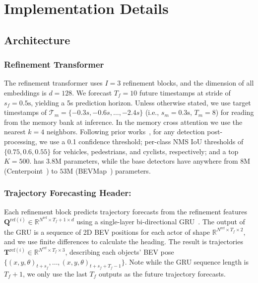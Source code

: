 \section{Implementation Details}
\label{sec:imp}

\subsection{Architecture}

\subsubsection{Refinement Transformer}

The refinement transformer uses $I = 3$ refinement blocks, and the dimension of all embeddings is $d = 128$.
We forecast $T_f = 10$ future timestamps at stride of $s_f = 0.5\text{s}$, yielding a 5s prediction horizon.
Unless otherwise stated, we use target timestamps of $\mathcal{T}_m = \{-0.3s, -0.6s, \dots, -2.4s\}$ (i.e., $s_m = 0.3\text{s}$, $T_m = 8$) for reading from the memory bank at inference.
In the memory cross attention we use the nearest $k=4$ neighbors.
Following prior works~\cite{hednet,safdnet,centerpoint}, for any detection post-processing, we use a 0.1 confidence threshold; per-class NMS IoU thresholds of $\{0.75, 0.6, 0.55\}$ for vehicles, pedestrians, and cyclists, respectively; and a top $K=500$.
\ourmodel{} has $3.8$M parameters, while the base detectors have anywhere from $8$M (Centerpoint~\cite{centerpoint}) to $53$M (BEVMap~\cite{chang2024bevmap}) parameters.


\subsubsection{Trajectory Forecasting Header:}

Each refinement block predicts trajectory forecasts from the refinement features $\mathbf{Q}^{\mathrm{ref}(i)} \in \mathbb{R}^{N^\mathrm{ref} \times T_f + 1 \times d}$ using a
single-layer bi-directional GRU~\cite{cho2014learning}.
The output of the GRU is %
a sequence of 2D BEV positions for each actor of shape $\mathbb{R}^{N^\mathrm{ref} \times T_f \times 2}$,
and we use finite differences to calculate the heading.
The result is trajectories
$\mathbf{T}^{\mathrm{ref}(i)} \in \mathbb{R}^{N^\mathrm{ref} \times T_f \times 3}$,
describing each objects' BEV pose $\{(x, y, \theta)_{t + s_f}, \dots, (x, y, \theta)_{t + s_f + T_f - 1}\}$.
Note while the GRU sequence length is $T_f + 1$, we only use the last $T_f$ outputs as the future trajectory forecasts.


